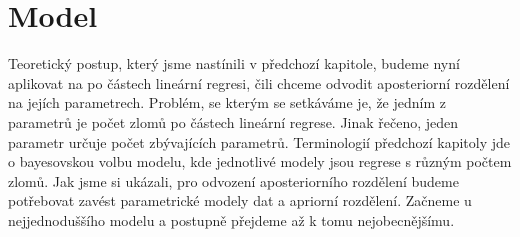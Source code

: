 \documentclass[czech,master,public,dept470,male,cpdeclaration,oneside, python]{diploma}
\begin{document}
%
\section{Model}
Teoretický postup, který jsme nastínili v předchozí kapitole, budeme nyní aplikovat na po částech lineární regresi, čili chceme odvodit aposteriorní rozdělení na jejích parametrech. Problém, se kterým se setkáváme je, že jedním z parametrů je počet zlomů po částech lineární regrese. Jinak řečeno, jeden parametr určuje počet zbývajících parametrů. Terminologií předchozí kapitoly jde o bayesovskou volbu modelu, kde jednotlivé modely jsou regrese s různým počtem zlomů. Jak jsme si ukázali, pro odvození aposteriorního rozdělení budeme potřebovat zavést parametrické modely dat a apriorní rozdělení. Začneme u nejjednoduššího modelu a postupně přejdeme až k tomu nejobecnějšímu.
\par \par
\end{document}
